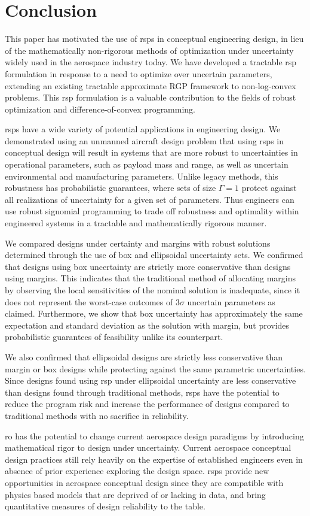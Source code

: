 \section{Conclusion}

This paper has motivated the use of \gls{rsp}s in conceptual engineering
design, in lieu of the mathematically non-rigorous methods of optimization under uncertainty
widely used in the aerospace industry today. We have developed a tractable \gls{rsp} formulation
in response to a need to optimize over uncertain parameters, extending an
existing tractable approximate RGP framework to non-log-convex problems.
This \gls{rsp} formulation is a valuable contribution to the fields of robust
optimization and difference-of-convex programming.

\gls{rsp}s have a wide variety of potential applications in engineering design.
We demonstrated using an unmanned aircraft design problem
that using \gls{rsp}s in conceptual design will result in systems
that are more robust to uncertainties in operational parameters,
such as payload mass and range, as well as uncertain environmental and manufacturing parameters.
Unlike legacy methods, this robustness has probabilistic guarantees, where sets of size $\Gamma=1$
protect against all realizations of uncertainty for a given set of parameters.
Thus engineers can use robust signomial programming to trade off
robustness and optimality within engineered systems in a tractable and mathematically rigorous manner.

We compared designs under certainty and margins with robust solutions
determined through the use of box and ellipsoidal uncertainty sets. We
confirmed that designs using box uncertainty are strictly more conservative
than designs using margins. This indicates that the traditional method of allocating margins
by observing the local sensitivities of the nominal solution is inadequate, since it does not
represent the worst-case outcomes of $3\sigma$ uncertain parameters as claimed.
Furthermore, we show that box uncertainty
has approximately the same expectation and standard deviation as the solution with margin,
but provides probabilistic guarantees of feasibility unlike its counterpart.

We also confirmed that ellipsoidal designs are strictly less conservative
than margin or box designs while protecting against the same
parametric uncertainties. Since designs found using \gls{rsp}
under ellipsoidal uncertainty are less conservative
than designs found through traditional methods, \gls{rsp}s have the potential to reduce
the program risk and increase the performance
of designs compared to traditional methods with no sacrifice in reliability.

\gls{ro} has the potential to change current aerospace design paradigms by introducing
mathematical rigor to design under uncertainty. Current aerospace
conceptual design practices still rely heavily on the expertise of established
engineers even in absence of prior experience exploring the design space.
\gls{rsp}s provide new opportunities in aerospace conceptual design
since they are compatible with physics based models
that are deprived of or lacking in data, and bring quantitative
measures of design reliability to the table.
